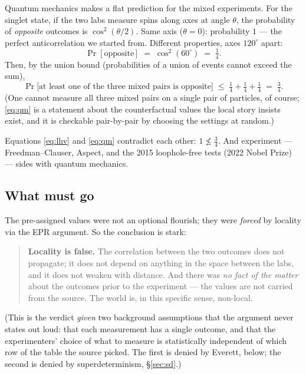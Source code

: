 \documentclass[11pt,a4paper]{article}
\theoremstyle{remark}
\begin{document}
Quantum mechanics makes a flat prediction for the mixed experiments. For the
singlet state, if the two labs measure spins along axes at angle $\theta$, the
probability of \emph{opposite} outcomes is $\cos^2(\theta/2)$. Same axis
($\theta=0$): probability $1$ --- the perfect anticorrelation we started from.
Different properties, axes $120^\circ$ apart:
\begin{equation}
  \Pr[\text{opposite}] \;=\; \cos^2(60^\circ) \;=\; \tfrac14 .
\end{equation}
Then, by the union bound (probabilities of a union of events cannot exceed the sum),
\begin{equation}
  \Pr\bigl[\text{at least one of the three mixed pairs is opposite}\bigr]
  \;\le\; \tfrac14+\tfrac14+\tfrac14 \;=\; \tfrac34 .
  \label{eq:qm}
\end{equation}
(One cannot measure all three mixed pairs on a single pair of particles, of
course; \eqref{eq:qm} is a statement about the counterfactual values the
local story insists exist, and it is checkable pair-by-pair by choosing the
settings at random.)

Equations \eqref{eq:lhv} and \eqref{eq:qm} contradict each other:
$1 \not\le \tfrac34$. And experiment --- Freedman--Clauser, Aspect, and the 2015
loophole-free tests (2022 Nobel Prize) --- sides with quantum mechanics.

\subsection{What must go}

The pre-assigned values were not an optional flourish; they were \emph{forced} by
locality via the EPR argument. So the conclusion is stark:

\begin{quote}
\textbf{Locality is false.} The correlation between the two outcomes does not
propagate; it does not depend on anything in the space between the labs, and it
does not weaken with distance. And there was \emph{no fact of the matter} about
the outcomes prior to the experiment --- the values are not carried from the
source. The world is, in this specific sense, non-local.
\end{quote}
(This is the verdict \emph{given} two background assumptions that the argument
never states out loud: that each measurement has a single outcome, and that the
experimenters' choice of what to measure is statistically independent of which
row of the table the source picked. The first is denied by Everett, below; the
second is denied by superdeterminism, \S\ref{sec:sd}.)
\end{document}

